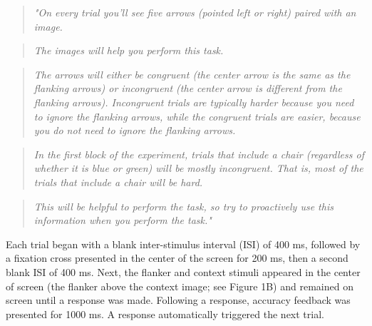 \documentclass[english,,man,floatsintext]{apa6}
\begin{document}
\begin{quote}
\emph{"On every trial you'll see five arrows (pointed left or right) paired with an image.}
\end{quote}

\begin{quote}
\emph{The images will help you perform this task.}
\end{quote}

\begin{quote}
\emph{The arrows will either be congruent (the center arrow is the same as the flanking arrows) or incongruent (the center arrow is different from the flanking arrows). Incongruent trials are typically harder because you need to ignore the flanking arrows, while the congruent trials are easier, because you do not need to ignore the flanking arrows.}
\end{quote}

\begin{quote}
\emph{In the first block of the experiment, trials that include a chair (regardless of whether it is blue or green) will be mostly incongruent. That is, most of the trials that include a chair will be hard.}
\end{quote}

\begin{quote}
\emph{This will be helpful to perform the task, so try to proactively use this information when you perform the task."}
\end{quote}

Each trial began with a blank inter-stimulus interval (ISI) of 400 ms, followed by a fixation cross presented in the center of the screen for 200 ms, then a second blank ISI of 400 ms. Next, the flanker and context stimuli appeared in the center of screen (the flanker above the context image; see Figure 1B) and remained on screen until a response was made. Following a response, accuracy feedback was presented for 1000 ms. A response automatically triggered the next trial.
\end{document}

